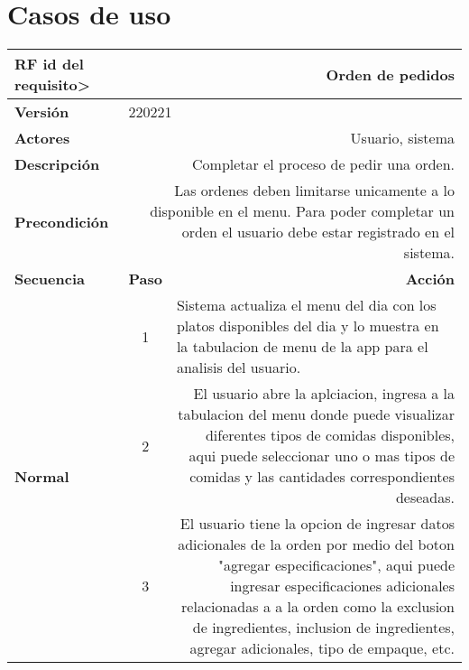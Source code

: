 \documentclass[conference]{IEEEtran}
\begin{document}
\section{Casos de uso}

\begin{table}[H]
  \centering
  \begin{adjustbox}{width=0.45\textwidth}
    \begin{tabular}{|p{11.215em}|r|r|}
    \toprule
    \textbf{RF id del requisito>} & \multicolumn{2}{p{37.43em}|}{\textbf{Orden de pedidos}} \\
    \midrule
    \textbf{Versión} & \multicolumn{2}{l|}{220221} \\
    \midrule
    \textbf{Actores} & \multicolumn{2}{p{37.43em}|}{Usuario, sistema} \\
    \midrule
    \textbf{Descripción} & \multicolumn{2}{p{37.43em}|}{Completar el proceso de pedir una orden.} \\
    \midrule
    \textbf{Precondición} & \multicolumn{2}{p{37.43em}|}{Las ordenes deben limitarse unicamente a lo disponible en el menu. Para poder completar un orden el usuario debe estar registrado en el sistema.} \\
    \midrule
    \textbf{Secuencia} & \multicolumn{1}{p{5.43em}|}{\textbf{Paso}} & \multicolumn{1}{p{32em}|}{\textbf{Acción}} \\
    \midrule
    \multirow{7}[12]{*}{\textbf{Normal}} & \multicolumn{1}{c|}{\multirow{2}[2]{*}{1}} & \multicolumn{1}{l|}{\multirow{2}[2]{*}{Sistema actualiza el menu del dia con los platos disponibles del dia y lo muestra en la tabulacion de menu de la app para el analisis del usuario.}} \\
    \multicolumn{1}{|c|}{} &       &  \\
\cmidrule{2-3}    \multicolumn{1}{|c|}{} & \multicolumn{1}{c|}{2} & \multicolumn{1}{p{32em}|}{El usuario abre la aplciacion, ingresa a la tabulacion del menu donde puede visualizar diferentes tipos de comidas disponibles, aqui puede seleccionar uno o mas tipos de comidas y las cantidades correspondientes deseadas.} \\
\cmidrule{2-3}    \multicolumn{1}{|c|}{} & \multicolumn{1}{c|}{3} & \multicolumn{1}{p{32em}|}{El usuario tiene la opcion de ingresar datos adicionales de la orden por medio del boton "agregar especificaciones", aqui puede ingresar especificaciones adicionales relacionadas a a la orden como la exclusion de ingredientes, inclusion de ingredientes, agregar adicionales, tipo de empaque, etc.} \\

\end{tabular}
\end{adjustbox}
\end{table}
\end{document}
